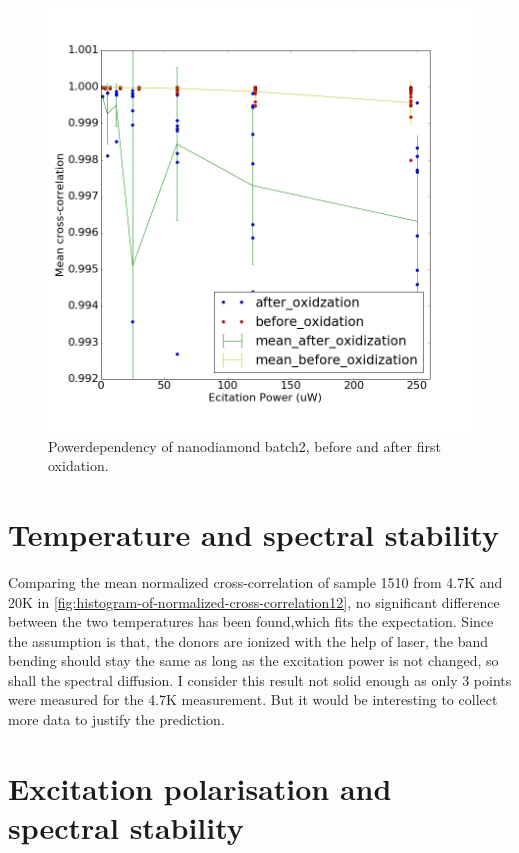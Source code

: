 \begin{figure}[h]
\centering
\includegraphics[width=0.7\linewidth]{Figures/pic/powerdependencybeforeafteroxidation}
\caption{Powerdependency of nanodiamond batch2, before and after first oxidation.}
\label{fig:powerdependencybeforeafteroxidation}
\end{figure}

\section{Temperature and spectral stability}
Comparing the mean normalized cross-correlation of sample 1510 from 4.7K and 20K in \ref{fig:histogram-of-normalized-cross-correlation12}, no significant difference between the two temperatures has been found,which fits the expectation. Since the assumption is that, the donors are ionized with the help of laser, the band bending should stay the same as long as the excitation power is not changed, so shall the spectral diffusion.
I consider this result not solid enough as only 3 points were measured for the 4.7K measurement. But it would be interesting to collect more data to justify the prediction.

\section{Excitation polarisation and spectral stability}

